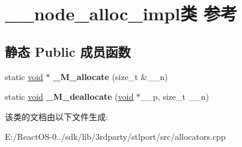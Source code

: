 \hypertarget{class____node__alloc__impl}{}\section{\+\_\+\+\_\+node\+\_\+alloc\+\_\+impl类 参考}
\label{class____node__alloc__impl}
\subsection*{静态 Public 成员函数}
\begin{DoxyCompactItemize}
\item 
\mbox{\label{class____node__alloc__impl_abfa10ed458cef7c86dfb20b2ad3fdc94}} 
static \hyperlink{interfacevoid}{void} $\ast$ {\bfseries \+\_\+\+M\+\_\+allocate} (size\+\_\+t \&\+\_\+\+\_\+n)
\item 
\mbox{\label{class____node__alloc__impl_a73a68b9b6dec9c3053d2433dd9bc0a6b}} 
static \hyperlink{interfacevoid}{void} {\bfseries \+\_\+\+M\+\_\+deallocate} (\hyperlink{interfacevoid}{void} $\ast$\+\_\+\+\_\+p, size\+\_\+t \+\_\+\+\_\+n)
\end{DoxyCompactItemize}


该类的文档由以下文件生成\+:\begin{DoxyCompactItemize}
\item 
E\+:/\+React\+O\+S-\/0../sdk/lib/3rdparty/stlport/src/allocators.\+cpp\end{DoxyCompactItemize}
